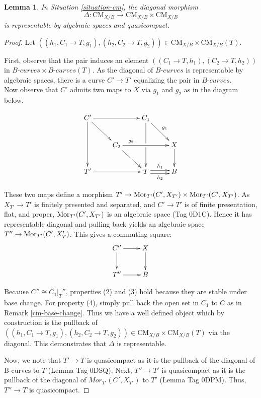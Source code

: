\documentclass{stacks-project}
\theoremstyle{plain}
\newtheorem{lemma}[subsection]{Lemma}
\theoremstyle{definition}
\theoremstyle{remark}
\numberwithin{equation}{subsection}
\def\Mor{\mathop{\rm Mor}\nolimits}
\def\CMfunctor{\mathcal{C}\!{\it oh}}
\def\CMfunctor{\text{CM}}
\begin{document}
\begin{lemma}
	In Situation \ref{situation-cm}, the diagonal morphism 
	\[\Delta:\CMfunctor_{X/B}\rightarrow\CMfunctor_{X/B}\times\CMfunctor_{X/B}\]
	is representable by algebraic spaces and quasicompact.
	\label{cm-rep-diagonal}
\end{lemma}
\begin{proof}
	Let $( (h_1,C_1\rightarrow T, g_1) ,( h_2, C_2\rightarrow T, g_2))\in \CMfunctor_{X/B}\times\CMfunctor_{X/B}(T)$.
	
	First, observe that the pair induces an element $((C_1\rightarrow T, h_1), (C_2\rightarrow T, h_2))$ in $\textit{B-curves}\times \textit{B-curves}(T)$.
	As the diagonal of $\textit{B-curves}$ is representable by algebraic spaces, there is a curve $C' \to T'$ equalizing the pair in $\textit{B-curves}$. \\
	Now observe that $C'$ admits two maps to $X$ via $g_1$ and $g_2$ as in the diagram below. 

\[\xymatrix{
		C'\ar[rr]\ar[dr]\ar[dd]&&C_1\ar[dd]|!{[dl];[dr]}\hole\ar[dr]^{g_1}&\\
		&C_2\ar[rr]^(.25){g_2}\ar[dr]& & X\ar[d]\\
		T'\ar[rr]& & T\ar@<.5ex>[r]^{h_1} \ar@<-.5ex>[r]_{h_2} & B
	}
	\]	
	
	These two maps define a morphism $T' \to \Mor_{T'}(C',X_{T'}) \times \Mor_{T'}(C',X_{T'})$. As $X_{T'} \to T'$ is finitely presented and separated, and $C'\to T'$ is of finite presentation, flat, and proper, $\Mor_{T'}(C',X_{T'})$ is an algebraic space (Tag 0D1C). Hence it has representable diagonal and pulling back yields an algebraic space $T'' \to \Mor_{T'}(C',X_T')$. This gives a commuting square:
	$$
	\xymatrix{
	C'' \ar[r] \ar[d] & X \ar[d]\\
	T'' \ar[r] & B
}
$$



	Because $C''\cong C_1|_T''$, properties (2) and (3) hold because they are stable under base change.
	For property (4), simply pull back the open set in $C_1$ to $C$ as in Remark \ref{cm-base-change}. Thus we have a well defined object which by construction is the pullback of $( (h_1,C_1\rightarrow T, g_1) ,( h_2, C_2\rightarrow T, g_2))\in \CMfunctor_{X/B}\times\CMfunctor_{X/B}(T)$ via the diagonal.
	This demonstrates that $\Delta$ is representable.

	Now, we note that $T'\rightarrow T$ is quasicompact as it is the pullback of the diagonal of $\text{B-curves}$ to $T$ (Lemma Tag 0DSQ).
	Next, $T''\rightarrow T'$ is quasicompact as it is the pullback of the diagonal of $Mor_{T'}(C',X_{T'})$ to $T'$ (Lemma Tag 0DPM).
	Thus, $T''\rightarrow T$ is quasicompact.
\end{proof}
\end{document}
